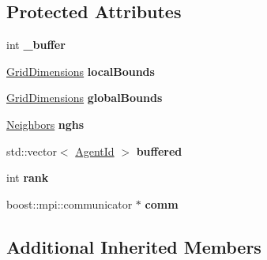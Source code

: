 \subsection*{Protected Attributes}
\begin{DoxyCompactItemize}
\item 
\hypertarget{classrepast_1_1_shared_base_grid_a2e19f6831a277a4df1373920ea57d8eb}{int {\bfseries \-\_\-buffer}}\label{classrepast_1_1_shared_base_grid_a2e19f6831a277a4df1373920ea57d8eb}

\item 
\hypertarget{classrepast_1_1_shared_base_grid_aa9ea56859b5278b0d6bc2bbd8ab4c46b}{\hyperlink{classrepast_1_1_grid_dimensions}{Grid\-Dimensions} {\bfseries local\-Bounds}}\label{classrepast_1_1_shared_base_grid_aa9ea56859b5278b0d6bc2bbd8ab4c46b}

\item 
\hypertarget{classrepast_1_1_shared_base_grid_ad0097db08b66ff49a0af46251221c045}{\hyperlink{classrepast_1_1_grid_dimensions}{Grid\-Dimensions} {\bfseries global\-Bounds}}\label{classrepast_1_1_shared_base_grid_ad0097db08b66ff49a0af46251221c045}

\item 
\hypertarget{classrepast_1_1_shared_base_grid_a204f5c23dd15d124d558140cc1571e7c}{\hyperlink{classrepast_1_1_neighbors}{Neighbors} {\bfseries nghs}}\label{classrepast_1_1_shared_base_grid_a204f5c23dd15d124d558140cc1571e7c}

\item 
\hypertarget{classrepast_1_1_shared_base_grid_aaa8d5d36ce831a360a88c0149f40cd77}{std\-::vector$<$ \hyperlink{classrepast_1_1_agent_id}{Agent\-Id} $>$ {\bfseries buffered}}\label{classrepast_1_1_shared_base_grid_aaa8d5d36ce831a360a88c0149f40cd77}

\item 
\hypertarget{classrepast_1_1_shared_base_grid_a48f63bb491afa1078c8d6598b32b5e3e}{int {\bfseries rank}}\label{classrepast_1_1_shared_base_grid_a48f63bb491afa1078c8d6598b32b5e3e}

\item 
\hypertarget{classrepast_1_1_shared_base_grid_ab9c405f324b799fa0b5fc7472cf6ab49}{boost\-::mpi\-::communicator $\ast$ {\bfseries comm}}\label{classrepast_1_1_shared_base_grid_ab9c405f324b799fa0b5fc7472cf6ab49}

\end{DoxyCompactItemize}
\subsection*{Additional Inherited Members}


